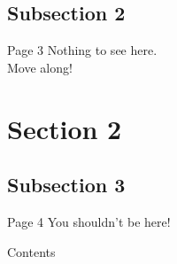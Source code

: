 \documentclass[xcolor=dvipsnames]{beamer}
\begin{document}
\subsection{Subsection 2}

\begin{frame}{Page 3}
    Nothing to see here. \\
    Move along!
\end{frame}



\section{Section 2}
\subsection{Subsection 3}
\begin{frame}{Page 4}
    You shouldn't be here!
\end{frame}



\begin{frame}{Contents}
    \tableofcontents
\end{frame}
\end{document}
